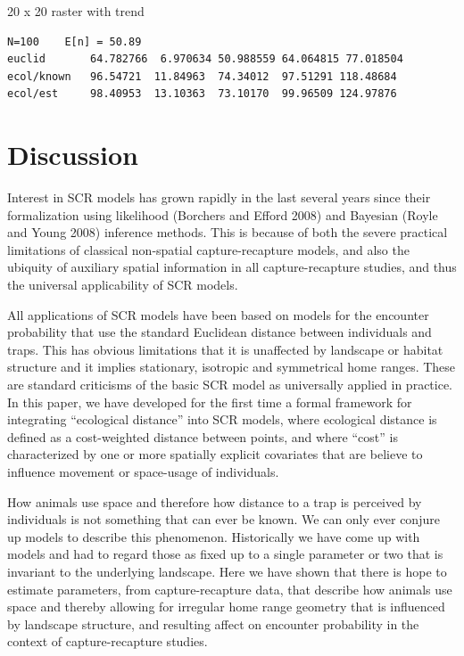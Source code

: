 20 x 20 raster with trend
\begin{verbatim}
N=100    E[n] = 50.89
euclid       64.782766  6.970634 50.988559 64.064815 77.018504 
ecol/known   96.54721  11.84963  74.34012  97.51291 118.48684 
ecol/est     98.40953  13.10363  73.10170  99.96509 124.97876 
\end{verbatim}


\section{Discussion}

Interest in SCR models has grown rapidly in the last several years
since their formalization using likelihood (Borchers and Efford 2008)
and Bayesian (Royle and Young 2008) inference methods. This is because
of both the severe practical limitations of classical non-spatial
capture-recapture models, and also the ubiquity of auxiliary spatial
information in all capture-recapture studies, and thus the universal
applicability of SCR models.

All applications of SCR models have been based on models for the
encounter probability that use the standard Euclidean distance between
individuals and traps. This has obvious limitations that it is
unaffected by landscape or habitat structure and it implies
stationary,  isotropic and symmetrical home ranges. These are standard
criticisms of the basic SCR model as universally applied in practice. 
In this paper,  we have developed for the first time a formal framework for integrating
``ecological distance'' into SCR models, where ecological distance is
defined as a cost-weighted distance between points, and where ``cost''
is characterized by one or more spatially explicit covariates that are
believe to influence movement or space-usage of individuals.  


How animals use space and therefore how distance to a trap is
perceived by individuals is not something that can ever be known. We
can only ever conjure up models to describe this
phenomenon. Historically we have come up with models and had to regard
those as fixed up to a single parameter or two that is invariant to
the underlying landscape. Here we have shown that there is hope to
estimate parameters, from capture-recapture data,
 that describe how animals use space and thereby
allowing for irregular home range geometry that is influenced by
landscape structure, and resulting affect on encounter probability in
the context of capture-recapture studies. 

